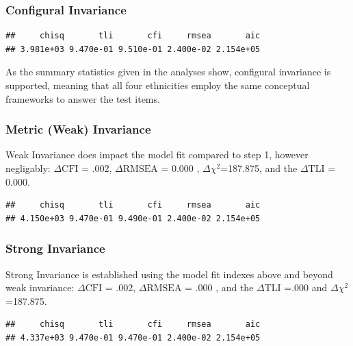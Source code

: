 \documentclass{article}\usepackage[]{graphicx}\usepackage[]{color}
\makeatletter
\newenvironment{kframe}{%
 \def\at@end@of@kframe{}%
 \ifinner\ifhmode%
  \def\at@end@of@kframe{\end{minipage}}%
  \begin{minipage}{\columnwidth}%
 \fi\fi%
 \def\FrameCommand##1{\hskip\@totalleftmargin \hskip-\fboxsep
 \colorbox{shadecolor}{##1}\hskip-\fboxsep
     \hskip-\linewidth \hskip-\@totalleftmargin \hskip\columnwidth}%
 \MakeFramed {\advance\hsize-\width
   \@totalleftmargin\z@ \linewidth\hsize
   \@setminipage}}%
 {\par\unskip\endMakeFramed%
 \at@end@of@kframe}
\newenvironment{knitrout}{}{} %
\makeatother
\begin{document}
\subsubsection{Configural Invariance}
\begin{knitrout}
\color{fgcolor}\begin{kframe}
\begin{verbatim}
##     chisq       tli       cfi     rmsea       aic 
## 3.981e+03 9.470e-01 9.510e-01 2.400e-02 2.154e+05
\end{verbatim}
\end{kframe}
\end{knitrout}

As the summary statistics given in the analyses show, configural invariance is supported, meaning that all four ethnicities employ the same conceptual frameworks to answer the test items.
\subsubsection{Metric (Weak) Invariance}
Weak Invariance does impact the model fit compared to step 1, however negligably: $\Delta\mathrm{CFI}$ = .002, $\Delta\mathrm{RMSEA}$ = 0.000 , $\Delta$$\chi^2$=187.875, and the $\Delta\mathrm{TLI}$ = 0.000.

\begin{knitrout}
\color{fgcolor}\begin{kframe}
\begin{verbatim}
##     chisq       tli       cfi     rmsea       aic 
## 4.150e+03 9.470e-01 9.490e-01 2.400e-02 2.154e+05
\end{verbatim}
\end{kframe}
\end{knitrout}


\subsubsection{Strong Invariance}
Strong Invariance is established using the model fit indexes above and beyond weak invariance: $\Delta\mathrm{CFI}$ = .002, $\Delta\mathrm{RMSEA}$ = .000 , and the $\Delta\mathrm{TLI}$ =.000 and $\Delta$$\chi^2$=187.875.

\begin{knitrout}
\color{fgcolor}\begin{kframe}
\begin{verbatim}
##     chisq       tli       cfi     rmsea       aic 
## 4.337e+03 9.470e-01 9.470e-01 2.400e-02 2.154e+05
\end{verbatim}
\end{kframe}
\end{knitrout}
\end{document}

